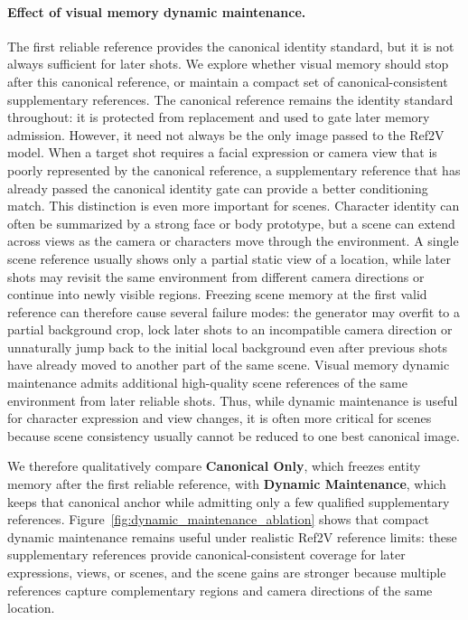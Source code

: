 \paragraph{Effect of visual memory dynamic maintenance.}
The first reliable reference provides the canonical identity standard, but it is not always sufficient for later shots. We explore whether visual memory should stop after this canonical reference, or maintain a compact set of canonical-consistent supplementary references. The canonical reference remains the identity standard throughout: it is protected from replacement and used to gate later memory admission. However, it need not always be the only image passed to the Ref2V model. When a target shot requires a facial expression or camera view that is poorly represented by the canonical reference, a supplementary reference that has already passed the canonical identity gate can provide a better conditioning match.
This distinction is even more important for scenes. Character identity can often be summarized by a strong face or body prototype, but a scene can extend across views as the camera or characters move through the environment. A single scene reference usually shows only a partial static view of a location, while later shots may revisit the same environment from different camera directions or continue into newly visible regions.
Freezing scene memory at the first valid reference can therefore cause several failure modes: the generator may overfit to a partial background crop, lock later shots to an incompatible camera direction or unnaturally jump back to the initial local background even after previous shots have already moved to another part of the same scene.
Visual memory dynamic maintenance admits additional high-quality scene references of the same environment from later reliable shots. Thus, while dynamic maintenance is useful for character expression and view changes, it is often more critical for scenes because scene consistency usually cannot be reduced to one best canonical image.

We therefore qualitatively compare \textbf{Canonical Only}, which freezes entity memory after the first reliable reference, with \textbf{Dynamic Maintenance}, which keeps that canonical anchor while admitting only a few qualified supplementary references. Figure~\ref{fig:dynamic_maintenance_ablation} shows that compact dynamic maintenance remains useful under realistic Ref2V reference limits: these supplementary references provide canonical-consistent coverage for later expressions, views, or scenes, and the scene gains are stronger because multiple references capture complementary regions and camera directions of the same location.

